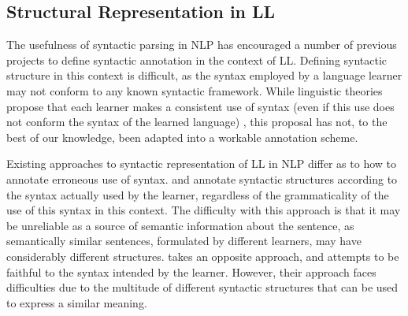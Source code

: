 \documentclass[letter,11pt]{article}
\begin{document}


\subsection{Structural Representation in LL}

The usefulness of syntactic parsing in NLP has encouraged a number of previous
projects to define syntactic annotation in the context of LL.
Defining syntactic structure in this context is difficult, as the syntax employed
by a language learner may not conform to any known syntactic framework.
While linguistic theories propose that each learner
makes a consistent use of syntax (even if this use does not conform the 
syntax of the learned language) \cite{huebner1985system,tarone1983variability},
this proposal has not, to the best of our knowledge, been adapted into a workable
annotation scheme.

Existing approaches to syntactic representation of LL in NLP
differ as to how to annotate erroneous use of syntax.
 and 
annotate syntactic structures according to the syntax actually used
by the learner, regardless of the grammaticality of the use of this
syntax in this context.
The difficulty with this approach is that it may be unreliable as
a source of semantic information about the sentence, as semantically similar
sentences, formulated by different learners, may have considerably different
structures.  takes an opposite approach, and attempts
to be faithful to the syntax intended by the learner. However, their
approach faces difficulties due to the multitude of different syntactic
structures that can be used to express a similar meaning.
\end{document}
